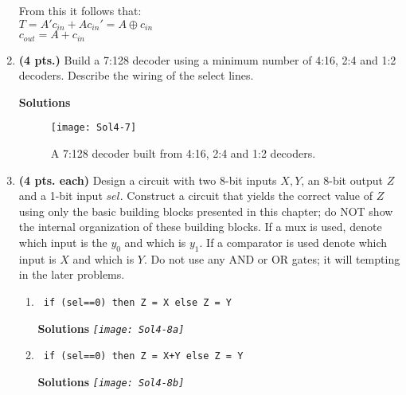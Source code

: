 \begin{enumerate}
\begin{onlysolution}
{                    From this it follows that: \\
                    $T=A'c_{in} + A c_{in}'=A \oplus c_{in}$ \\
                    $c_{out} = A + c_{in}$
                }
            \end{onlysolution}
        \item \textbf{(4 pts.)} Build a 7:128 decoder using a minimum number of
            4:16, 2:4 and 1:2 decoders. Describe the wiring of the select lines.

            \begin{onlysolution} \textbf{Solutions}
                \begin{figure}[h]
                    \centering
                    \texttt{[image: Sol4-7]}
                    \caption{A 7:128 decoder built from 4:16, 2:4 and 1:2 decoders.}
                    \label{fig:bighwdec}
                \end{figure}
                \filbreak
            \end{onlysolution}
        \item \textbf{(4 pts. each)} Design a circuit with two 8-bit inputs $X,Y$, an
            8-bit output $Z$ and a 1-bit input $sel$.  Construct a circuit that yields the
            correct value of $Z$ using only the basic building blocks presented in this
            chapter; do NOT show the internal organization of these building blocks.  If
            a mux is used, denote which input is the $y_0$ and which is $y_1$.
            If a comparator is used denote which input is $X$ and which is $Y$.
            Do not use any AND or OR gates; it will tempting in the later problems.
            \begin{enumerate}
                \item \verb^ if (sel==0) then Z = X else Z = Y ^

                    \begin{onlysolution} \textbf{Solutions} \itshape{
                            \texttt{[image: Sol4-8a]}
                        }
                    \end{onlysolution}

                \item \verb^ if (sel==0) then Z = X+Y else Z = Y ^

                    \begin{onlysolution} \textbf{Solutions} \itshape{
                            \texttt{[image: Sol4-8b]}
                        }
                    \end{onlysolution}


\end{enumerate}
\end{enumerate}
